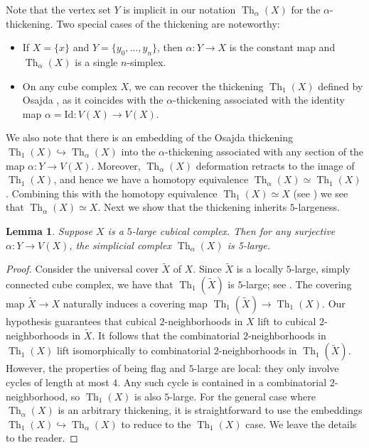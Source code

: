 \documentclass[12pt, letterpaper]{article}
\newcommand{\Th}{\operatorname{Th}}
\theoremstyle{plain}
\newtheorem{lem}[thm]{Lemma}
\theoremstyle{definition}
\begin{document}
Note that the vertex set $Y$ is implicit in our notation $\Th_\alpha(X)$ for the $\alpha$-thickening. Two special cases of the thickening are noteworthy:

\begin{itemize}
    \item If $X = \{x\}$ and $Y = \{y_0, \ldots, y_n\}$, then $\alpha \colon Y \to X$ is the constant map and $\Th_{\alpha}(X)$ is a single $n$-simplex.
    \item On any cube complex $X$, we can recover the thickening $\Th_1(X)$ defined by Osajda \cite{osajda}, as it coincides with the $\alpha$-thickening associated with the identity map ${\alpha = \mathrm{Id} \colon V(X) \to V(X)}$.
\end{itemize}

We also note that there is an embedding of the Osajda thickening $\Th_1(X) \hookrightarrow \Th_\alpha(X)$ into the $\alpha$-thickening associated with any section of the map $\alpha \colon Y\rightarrow V(X)$. Moreover, $\Th_\alpha(X)$ deformation retracts to the image of $\Th_1(X)$, and hence we have a homotopy equivalence $\Th_\alpha(X)\simeq \Th_1(X)$. Combining this with the homotopy equivalence $\Th_1(X)\simeq X$ (see \cite[Lem.\ 3.5]{osajda}) we see that $\Th_\alpha(X)\simeq X$. Next we show that the thickening inherits $5$-largeness.

\begin{lem}\label{lem:flag 5-large}
    Suppose $X$ is a $5$-large cubical complex. Then for any surjective $\alpha \colon Y \to V(X)$, the simplicial complex $\Th_\alpha(X)$ is 5-large.
\end{lem}

\begin{proof}
Consider the universal cover $\tilde X$ of $X$. Since $\tilde X$ is a locally $5$-large, simply connected cube complex, we have that $\Th_1(\tilde X)$ is $5$-large; see \cite[Prop.\ 3.4]{osajda}. The covering map $\tilde X \rightarrow X$ naturally induces a covering map $\Th_1(\tilde X) \rightarrow \Th_1(X)$. Our hypothesis guarantees that cubical $2$-neighborhoods in $X$ lift to cubical $2$-neighborhoods in $\tilde X$. It follows that the combinatorial $2$-neighborhoods in $\Th_1(X)$ lift isomorphically to combinatorial $2$-neighborhoods in $\Th_1(\tilde X)$. However, the properties of being flag and $5$-large are local: they only involve cycles of length at most $4$. Any such cycle is contained in a combinatorial $2$-neighborhood, so $\Th_1(X)$ is also $5$-large. For the general case where $\Th_\alpha(X)$ is an arbitrary thickening, it is straightforward to use the embeddings $\Th_1(X) \hookrightarrow \Th_\alpha(X)$ to reduce to the $\Th_1(X)$ case. We leave the details to the reader.
\end{proof}
\end{document}
